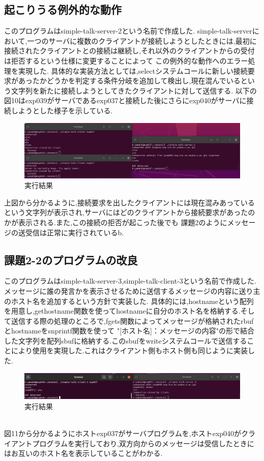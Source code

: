 \documentclass[dvipdfmx]{jarticle}
\begin{document}
\subsection{起こりうる例外的な動作}
このプログラムはsimple-talk-server-2という名前で作成した.
simple-talk-serverにおいて,一つのサーバに複数のクライアントが接続しようとしたときには,最初に接続されたクライアントとの接続は継続し,それ以外のクライアントからの受付は拒否するという仕様に変更することによって
この例外的な動作へのエラー処理を実現した.
具体的な実装方法としては,selectシステムコールに新しい接続要求があったかどうかを判定する条件分岐を追加して検出し,現在混んでいるという文字列を新たに接続しようとしてきたクライアントに対して送信する.
以下の図10はexp039がサーバであるexp037と接続した後にさらにexp040がサーバに接続しようとした様子を示している.
\begin{figure}[h]
    \centering
    \includegraphics[width=12cm]{3-2.png}
    \caption{実行結果}
\end{figure}

上図から分かるように,接続要求を出したクライアントには現在混みあっているという文字列が表示され,サーバにはどのクライアントから接続要求があったのかが表示される.また,この接続の拒否が起こった後でも
課題2のようにメッセージの送受信は正常に実行されているb.
\subsection{課題2-2のプログラムの改良}
このプログラムはsimple-talk-server-3,simple-talk-client-3という名前で作成した.
メッセージに誰の発言かを表示させるために送信するメッセージの内容に送り主のホスト名を追加するという方針で実装した.
具体的には,hostnameという配列を用意し,gethostname関数を使ってhostnameに自分のホスト名を格納する.そして送信する際の処理のところで,fgets関数によってメッセージが格納されたrbufとhostnameをsnprintf関数を使って
"[ホスト名]：メッセージの内容"の形で結合した文字列を配列sbufに格納する.このsbufをwriteシステムコールで送信することにより使用を実現した.これはクライアント側もホスト側も同じように実装した.
\begin{figure}[h]
    \centering
    \includegraphics[width=12cm]{3-3.png}
    \caption{実行結果}
\end{figure}
\\
図11から分かるようにホストexp037がサーバプログラムを,ホストexp040がクライアントプログラムを実行しており,双方向からのメッセージは受信したときにはお互いのホスト名を表示していることがわかる.
\end{document}
